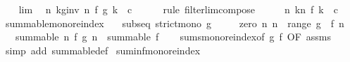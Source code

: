 \begin{isabellebody}
\ \ \isamarkupfalse%
\ lim\ \isamarkupfalse%
\ {\isachardoublequoteopen}{\isacharparenleft}{\kern0pt}{\isasymlambda}n{\isachardot}{\kern0pt}\ {\isasymSum}k{\isacharless}{\kern0pt}g{\isacharunderscore}{\kern0pt}inv\ n{\isachardot}{\kern0pt}\ f\ {\isacharparenleft}{\kern0pt}g\ k{\isacharparenright}{\kern0pt}{\isacharparenright}{\kern0pt}\ {\isasymlonglonglongrightarrow}\ c{\isachardoublequoteclose}\isanewline
\ \ \ \ \isamarkupfalse%
\ {\isacharparenleft}{\kern0pt}rule\ filterlim{\isacharunderscore}{\kern0pt}compose{\isacharparenright}{\kern0pt}\isanewline
\ \ \isamarkupfalse%
\ \isamarkupfalse%
\ {\isachardoublequoteopen}{\isacharparenleft}{\kern0pt}{\isasymlambda}n{\isachardot}{\kern0pt}\ {\isasymSum}k{\isacharless}{\kern0pt}n{\isachardot}{\kern0pt}\ f\ k{\isacharparenright}{\kern0pt}\ {\isasymlonglonglongrightarrow}\ c{\isachardoublequoteclose}\ \isacommand{{\isachardot}{\kern0pt}}\isamarkupfalse%
\isanewline
{}\isamarkupfalse%
%
\endisatagproof
{\isafoldproof}%
%
\isadelimproof
\isanewline
%
\endisadelimproof
\isanewline
{}\isamarkupfalse%
\ summable{\isacharunderscore}{\kern0pt}mono{\isacharunderscore}{\kern0pt}reindex{\isacharcolon}{\kern0pt}\isanewline
\ \ \ subseq{\isacharcolon}{\kern0pt}\ {\isachardoublequoteopen}strict{\isacharunderscore}{\kern0pt}mono\ g{\isachardoublequoteclose}\isanewline
\ \ \ \ \ zero{\isacharcolon}{\kern0pt}\ {\isachardoublequoteopen}{\isasymAnd}n{\isachardot}{\kern0pt}\ n\ {\isasymnotin}\ range\ g\ {\isasymLongrightarrow}\ f\ n\ {\isacharequal}{\kern0pt}\ {}{\isachardoublequoteclose}\isanewline
\ \ \ {\isachardoublequoteopen}summable\ {\isacharparenleft}{\kern0pt}{\isasymlambda}n{\isachardot}{\kern0pt}\ f\ {\isacharparenleft}{\kern0pt}g\ n{\isacharparenright}{\kern0pt}{\isacharparenright}{\kern0pt}\ {\isasymlongleftrightarrow}\ summable\ f{\isachardoublequoteclose}\isanewline
%
\isadelimproof
\ \ %
\endisadelimproof
%
\isatagproof
{}\isamarkupfalse%
\ sums{\isacharunderscore}{\kern0pt}mono{\isacharunderscore}{\kern0pt}reindex{\isacharbrackleft}{\kern0pt}of\ g\ f{\isacharcomma}{\kern0pt}\ OF\ assms{\isacharbrackright}{\kern0pt}\ \isamarkupfalse%
\ {\isacharparenleft}{\kern0pt}simp\ add{\isacharcolon}{\kern0pt}\ summable{\isacharunderscore}{\kern0pt}def{\isacharparenright}{\kern0pt}%
\endisatagproof
{\isafoldproof}%
%
\isadelimproof
\isanewline
%
\endisadelimproof
\isanewline
{}\isamarkupfalse%
\ suminf{\isacharunderscore}{\kern0pt}mono{\isacharunderscore}{\kern0pt}reindex{\isacharcolon}{\kern0pt}\isanewline

\end{isabellebody}
